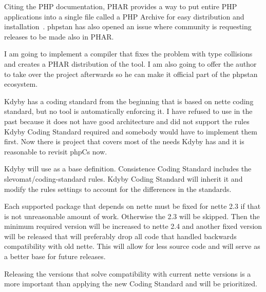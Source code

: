 Citing the PHP documentation, PHAR provides a way to put entire PHP applications into a single file called a PHP Archive for easy distribution and installation~\cite{php:phar}. \gls{phpstan} has also opened an issue  where community is requesting releases to be made also in PHAR.

I am going to implement a compiler that fixes the problem with type collisions and creates a PHAR distribution of the tool. I am also going to offer the author to take over the project afterwards so he can make it official part of the \gls{phpstan} ecosystem.


Kdyby has a coding standard from the beginning that is based on \gls{nette} coding standard, but no tool is automatically enforcing it. I have refused to use  in the past because it does not have good architecture and did not support the rules Kdyby Coding Standard required and somebody would have to implement them first. Now there is  project that covers most of the needs Kdyby has and it is reasonable to revisit \gls{phpCs} now.

Kdyby will use  as a base definition. Consistence Coding Standard includes the slevomat/coding-standard rules. Kdyby Coding Standard will inherit it and modify the rules settings to account for the differences in the standards.


Each supported package that depends on \gls{nette} must be fixed for \gls{nette} 2.3 if that is not unreasonable amount of work. Otherwise the 2.3 will be skipped. Then the minimum required version will be increased to \gls{nette} 2.4 and another fixed version will be released that will preferably drop all code that handled backwards compatibility with old \gls{nette}. This will allow for less source code and will serve as a better base for future releases.

Releasing the versions that solve compatibility with current \gls{nette} versions is a more important than applying the new Coding Standard and will be prioritized.


